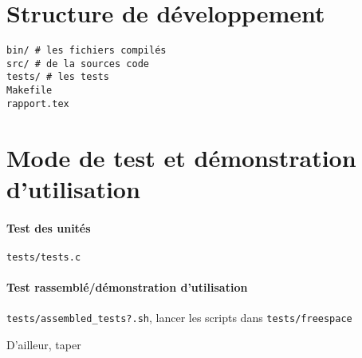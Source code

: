 \documentclass{report}
\begin{document}
\section{Structure de développement}

\begin{verbatim}
bin/ # les fichiers compilés
src/ # de la sources code
tests/ # les tests
Makefile
rapport.tex
\end{verbatim}

\section{Mode de test et démonstration d'utilisation}

\paragraph{Test des unités} \verb|tests/tests.c|
\paragraph{Test rassemblé/démonstration d'utilisation} \verb|tests/assembled_tests?.sh|, lancer
les scripts dans \verb|tests/freespace|

D'ailleur, taper 
\end{document}
